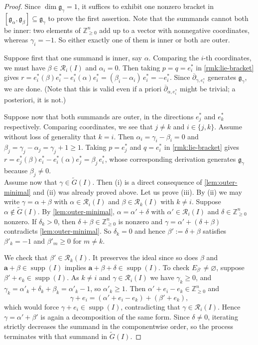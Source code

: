 \documentclass[11pt,letterpaper,reqno]{amsart}
\theoremstyle{remark}
\theoremstyle{definition}
\newcommand{\ZZ}[0]{\ensuremath{\mathbb{Z}}}
\newcommand{\supp}[0]{\ensuremath{\operatorname{supp}}}
\newcommand{\R}{\mathcal R}
\begin{document}
\begin{proof}
Since $\dim\mathfrak g_\gamma=1$, it suffices to exhibit one nonzero bracket in
$[\mathfrak g_\alpha,\mathfrak g_\beta]\subseteq\mathfrak g_\gamma$ to prove the first assertion. Note that the summands cannot both be inner: two elements of
$\ZZ^n_{\geq 0}$ add up to a vector with nonnegative coordinates, whereas
$\gamma_i=-1$. So either exactly one of them is inner or both are outer.

Suppose first that one summand is inner, say $\alpha$. Comparing the $i$-th
coordinates, we must have $\beta\in\R_i(I)$ and $\alpha_i=0$. Then taking
$p=q=e_i^*$ in \cref{rmk:lie-bracket} gives
$r=e_i^*(\beta)e_i^*-e_i^*(\alpha)e_i^*=(\beta_i-\alpha_i)\,e_i^*=-e_i^*$. Since $\overline\partial_{\gamma,e_i^*}$ generates $\mathfrak g_\gamma$, we are done. (Note that this is valid even if a priori $\overline\partial_{\alpha,e_i^*}$ might be trivial; a posteriori, it is not.)

Suppose now that both summands are outer, in the directions $e_j^*$ and $e_k^*$ respectively.  Comparing coordinates, we see that $j\neq k$ and $i\in\{j,k\}$. Assume
without loss of generality that $k=i$. Then $\alpha_i=\gamma_i-\beta_i=0$ and
$\beta_j=\gamma_j-\alpha_j=\gamma_j+1\geq1$. Taking $p=e_j^*$ and $q=e_i^*$ in
\cref{rmk:lie-bracket} gives $r=e_j^*(\beta)e_i^*-e_i^*(\alpha)e_j^*=\beta_j\,e_i^*$, whose corresponding derivation generates $\mathfrak g_\gamma$ because $\beta_j\neq0$.\\

Assume now that $\gamma\in\widetilde G(I)$. Then (i) is a direct consequence of \cref{lem:outer-minimal} and (ii) was already proved above. Let us prove (iii). By (ii) we may write $\gamma=\alpha+\beta$ with $\alpha\in\R_i(I)$ and $\beta\in\R_k(I)$ with $k\neq i$. Suppose $\alpha\notin\widetilde G(I)$. By
\cref{lem:outer-minimal}, $\alpha=\alpha'+\delta$ with $\alpha'\in\R_i(I)$ and $\delta\in\ZZ^n_{\geq 0}$ nonzero. If $\delta_k>0$, then $\delta+\beta\in\ZZ^n_{\geq 0}$ is nonzero and $\gamma=\alpha'+(\delta+\beta)$ contradicts \cref{lem:outer-minimal}. So $\delta_k=0$ and hence $\beta':=\delta+\beta$ satisfies $\beta'_k=-1$ and $\beta'_m\geq 0$ for $m\neq k$.

We check that $\beta'\in\R_k(I)$. It preserves the ideal since so does $\beta$ and $\mathbf{a}+\beta\in\supp(I)$ implies $\mathbf{a}+\beta+\delta\in\supp(I)$. To check $E_{\beta'}\neq\varnothing$, suppose $\beta'+e_k\in\supp(I)$. As $k\neq i$ and $\gamma\in\R_i(I)$ we have $\gamma_k\geq 0$, and
$\gamma_k=\alpha'_k+\delta_k+\beta_k=\alpha'_k-1$, so $\alpha'_k\geq1$.
Then $\alpha'+e_i-e_k\in\ZZ^n_{\geq 0}$ and
$$
\gamma+e_i=(\alpha'+e_i-e_k)+(\beta'+e_k),
$$
which would force $\gamma+e_i\in\supp(I)$, contradicting that $\gamma\in\R_i(I)$. Hence $\gamma=\alpha'+\beta'$ is again a decomposition of the same form. Since $\delta\neq0$, iterating strictly decreases the summand in the componentwise order, so the process terminates with that summand in $\widetilde G(I)$.
\end{proof}
\end{document}

